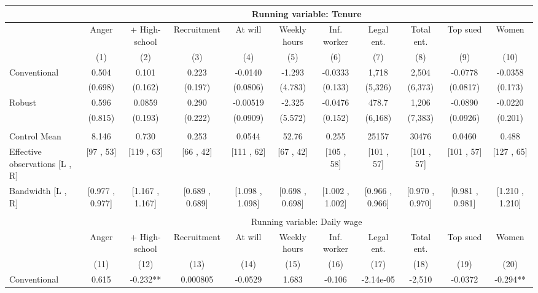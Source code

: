 \begin{tabular}{lcccccccccc}
\toprule
      & \multicolumn{10}{c}{Running variable: Tenure} \\
\midrule
      & Anger & + High-school & Recruitment & At will  & Weekly hours & Inf. worker & Legal ent. & Total ent. & Top sued & Women \\
\midrule
      & (1)   & (2)   & (3)   & (4)   & (5)   & (6)   & (7)   & (8)   & (9)   & (10) \\
\midrule
\midrule
Conventional & 0.504 & 0.101 & 0.223 & -0.0140 & -1.293 & -0.0333 & 1,718 & 2,504 & -0.0778 & -0.0358 \\
      & (0.698) & (0.162) & (0.197) & (0.0806) & (4.783) & (0.133) & (5,326) & (6,373) & (0.0817) & (0.173) \\
Robust & 0.596 & 0.0859 & 0.290 & -0.00519 & -2.325 & -0.0476 & 478.7 & 1,206 & -0.0890 & -0.0220 \\
      & (0.815) & (0.193) & (0.222) & (0.0909) & (5.572) & (0.152) & (6,168) & (7,383) & (0.0926) & (0.201) \\
      &       &       &       &       &       &       &       &       &       &  \\
\midrule
Control Mean & 8.146 & 0.730 & 0.253 & 0.0544 & 52.76 & 0.255 & 25157 & 30476 & 0.0460 & 0.488 \\
Effective observations [L , R] & [97 , 53] & [119 , 63] & [66 , 42] & [111 , 62] & [67 , 42] & [105 , 58] & [101 , 57] & [101 , 57] & [101 , 57] & [127 , 65] \\
Bandwidth [L , R] & [0.977 , 0.977] & [1.167 , 1.167] & [0.689 , 0.689] & [1.098 , 1.098] & [0.698 , 0.698] & [1.002 , 1.002] & [0.966 , 0.966] & [0.970 , 0.970] & [0.981 , 0.981] & [1.210 , 1.210] \\
\midrule
\midrule
      &       &       &       &       &       &       &       &       &       &  \\
\midrule
      & \multicolumn{10}{c}{Running variable: Daily wage} \\
\midrule
      & Anger & + High-school & Recruitment & At will  & Weekly hours & Inf. worker & Legal ent. & Total ent. & Top sued & Women \\
\midrule
      & (11)  & (12)  & (13)  & (14)  & (15)  & (16)  & (17)  & (18)  & (19)  & (20) \\
\midrule
\midrule
Conventional & 0.615 & -0.232** & 0.000805 & -0.0529 & 1.683 & -0.106 & -2.14e-05 & -2,510 & -0.0372 & -0.294** \\

\end{tabular}
